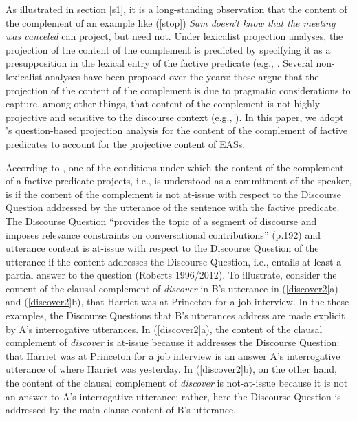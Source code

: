 \documentclass[11pt,fleqn]{article}
\newcommand{\6}{\mbox{$[\hspace*{-.6mm}[$}}
\newcommand{\9}{\mbox{$]\hspace*{-.6mm}]$}}
\newcommand{\citepos}[1]{\citeauthor{#1}'s \citeyear{#1}}
\begin{document}
As illustrated in section \ref{s1}, it is a long-standing observation that the content of the complement of an example like (\ref{stop}) {\em Sam doesn't know that the meeting was canceled} can project, but need not. Under lexicalist projection analyses, the projection of the content of the complement is predicted by specifying it as a presupposition in the lexical entry of the factive predicate (e.g., \citealt{heim83,vds92,schlenker10}. Several non-lexicalist analyses have been proposed over the years: these argue that the projection of the content of the complement is due to pragmatic considerations to capture, among other things, that content of the complement is not highly projective and sensitive to the discourse context (e.g., \citealt{wilson75,simons01,abusch02,abusch10,abrusan2011,abrusan2016,romoli2015}). In this paper, we adopt \citepos{best-question} question-based projection analysis for the content of the complement of factive predicates to account for the projective content of EASs.

According to \citealt{best-question}, one of the conditions under which the content of the complement of a factive predicate projects, i.e., is understood as a commitment of the speaker, is if the content of the complement is not at-issue with respect to the Discourse Question addressed by the utterance of the sentence with the factive predicate. The Discourse Question ``provides the topic of a segment of discourse and imposes relevance constraints on conversational contributions'' (p.192) and utterance content is at-issue with respect to the Discourse Question of the utterance if the content addresses the Discourse Question, i.e., entails at least a partial answer to the question (Roberts 1996/2012\nocite{roberts12}). To illustrate, consider the content of the clausal complement of {\em discover} in B's utterance in (\ref{discover2}a) and (\ref{discover2}b), that Harriet was at Princeton for a job interview. In the these examples, the Discourse Questions that B's utterances address are made explicit by A's interrogative utterances. In (\ref{discover2}a), the content of the clausal complement of {\em discover} is at-issue because it addresses the Discourse Question: that Harriet was at Princeton for a job interview is an answer A's interrogative utterance of where Harriet was yesterday. In (\ref{discover2}b), on the other hand, the content of the clausal complement of {\em discover} is not-at-issue because it is not an answer to A's interrogative utterance; rather, here the Discourse Question is addressed by the main clause content of B's utterance.
\end{document}
